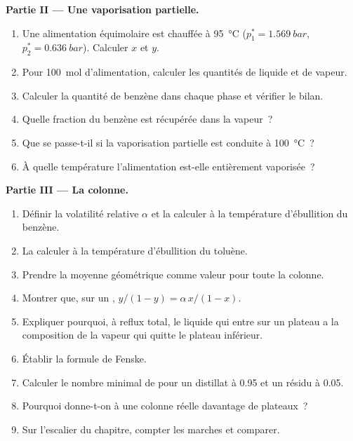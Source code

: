 \begin{problem}
\medskip
\noindent\textbf{Partie II --- Une vaporisation partielle.}
\begin{enumerate}[resume]
  \item Une alimentation équimolaire est chauffée à \qty{95}{\degreeCelsius} ($p_1^* =
        \qty{1.569}{bar}$, $p_2^* = \qty{0.636}{bar}$). Calculer $x$ et $y$.
  \item Pour \qty{100}{mol} d'alimentation, calculer les quantités de liquide et de vapeur.
  \item Calculer la quantité de benzène dans chaque phase et vérifier le bilan.
  \item Quelle fraction du benzène est récupérée dans la vapeur~?
  \item Que se passe-t-il si la vaporisation partielle est conduite à \qty{100}{\degreeCelsius}~?
  \item À quelle température l'alimentation est-elle entièrement vaporisée~?
\end{enumerate}

\medskip
\noindent\textbf{Partie III --- La colonne.}
\begin{enumerate}[resume]
  \item Définir la volatilité relative $\alpha$ et la calculer à la température
        d'ébullition du benzène.
  \item La calculer à la température d'ébullition du toluène.
  \item Prendre la moyenne géométrique comme valeur pour toute la colonne.
  \item Montrer que, sur un , $y/(1 - y) = \alpha\,x/(1 - x)$.
  \item Expliquer pourquoi, à reflux total, le liquide qui entre sur un plateau a la
        composition de la vapeur qui quitte le plateau inférieur.
  \item Établir la formule de Fenske.
  \item Calculer le nombre minimal de  pour un distillat à
        0.95 et un résidu à 0.05.
  \item Pourquoi donne-t-on à une colonne réelle davantage de plateaux~?
  \item Sur l'escalier du chapitre, compter les marches et comparer.
\end{enumerate}


\end{problem}
